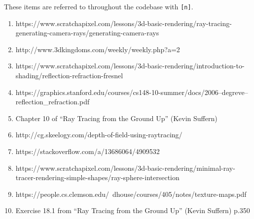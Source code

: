 \documentclass{article}
\begin{document}
These items are referred to throughout the codebase with \texttt{[n]}.

\begin{enumerate}
    \item https://www.scratchapixel.com/lessons/3d-basic-rendering/ray-tracing-generating-camera-rays/generating-camera-rays
    \item http://www.3dkingdoms.com/weekly/weekly.php?a=2
    \item https://www.scratchapixel.com/lessons/3d-basic-rendering/introduction-to-shading/reflection-refraction-fresnel
    \item https://graphics.stanford.edu/courses/cs148-10-summer/docs/2006--degreve--reflection\_refraction.pdf
    \item Chapter 10 of ``Ray Tracing from the Ground Up'' (Kevin Suffern)
    \item http://cg.skeelogy.com/depth-of-field-using-raytracing/
    \item https://stackoverflow.com/a/13686064/4909532
    \item https://www.scratchapixel.com/lessons/3d-basic-rendering/minimal-ray-tracer-rendering-simple-shapes/ray-sphere-intersection
    \item https://people.cs.clemson.edu/~dhouse/courses/405/notes/texture-maps.pdf
    \item Exercise 18.1 from ``Ray Tracing from the Ground Up'' (Kevin Suffern) p.350
\end{enumerate}
\end{document}
